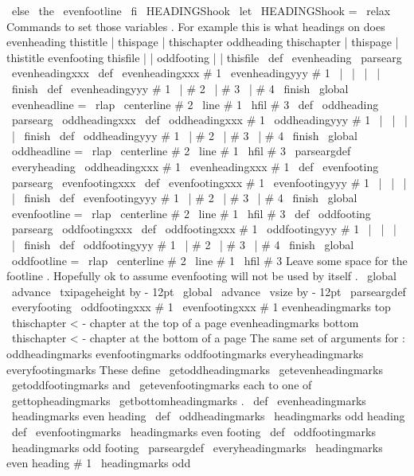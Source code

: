 {{{{{{\
else
\
the
\
evenfootline
\
fi
}
\
HEADINGShook
}
\
let
\
HEADINGShook
=
\
relax
%
Commands
to
set
those
variables
.
%
For
example
this
is
what
headings
on
does
%
evenheading
thistitle
|
thispage
|
thischapter
%
oddheading
thischapter
|
thispage
|
thistitle
%
evenfooting
thisfile
|
|
%
oddfooting
|
|
thisfile
\
def
\
evenheading
{
\
parsearg
\
evenheadingxxx
}
\
def
\
evenheadingxxx
#
1
{
\
evenheadingyyy
#
1
\
|
\
|
\
|
\
|
\
finish
}
\
def
\
evenheadingyyy
#
1
\
|
#
2
\
|
#
3
\
|
#
4
\
finish
{
%
\
global
\
evenheadline
=
{
\
rlap
{
\
centerline
{
#
2
}
}
\
line
{
#
1
\
hfil
#
3
}
}
}
\
def
\
oddheading
{
\
parsearg
\
oddheadingxxx
}
\
def
\
oddheadingxxx
#
1
{
\
oddheadingyyy
#
1
\
|
\
|
\
|
\
|
\
finish
}
\
def
\
oddheadingyyy
#
1
\
|
#
2
\
|
#
3
\
|
#
4
\
finish
{
%
\
global
\
oddheadline
=
{
\
rlap
{
\
centerline
{
#
2
}
}
\
line
{
#
1
\
hfil
#
3
}
}
}
\
parseargdef
\
everyheading
{
\
oddheadingxxx
{
#
1
}
\
evenheadingxxx
{
#
1
}
}
%
\
def
\
evenfooting
{
\
parsearg
\
evenfootingxxx
}
\
def
\
evenfootingxxx
#
1
{
\
evenfootingyyy
#
1
\
|
\
|
\
|
\
|
\
finish
}
\
def
\
evenfootingyyy
#
1
\
|
#
2
\
|
#
3
\
|
#
4
\
finish
{
%
\
global
\
evenfootline
=
{
\
rlap
{
\
centerline
{
#
2
}
}
\
line
{
#
1
\
hfil
#
3
}
}
}
\
def
\
oddfooting
{
\
parsearg
\
oddfootingxxx
}
\
def
\
oddfootingxxx
#
1
{
\
oddfootingyyy
#
1
\
|
\
|
\
|
\
|
\
finish
}
\
def
\
oddfootingyyy
#
1
\
|
#
2
\
|
#
3
\
|
#
4
\
finish
{
%
\
global
\
oddfootline
=
{
\
rlap
{
\
centerline
{
#
2
}
}
\
line
{
#
1
\
hfil
#
3
}
}
%
%
%
Leave
some
space
for
the
footline
.
Hopefully
ok
to
assume
%
evenfooting
will
not
be
used
by
itself
.
\
global
\
advance
\
txipageheight
by
-
12pt
\
global
\
advance
\
vsize
by
-
12pt
}
\
parseargdef
\
everyfooting
{
\
oddfootingxxx
{
#
1
}
\
evenfootingxxx
{
#
1
}
}
%
evenheadingmarks
top
\
thischapter
<
-
chapter
at
the
top
of
a
page
%
evenheadingmarks
bottom
\
thischapter
<
-
chapter
at
the
bottom
of
a
page
%
%
The
same
set
of
arguments
for
:
%
%
oddheadingmarks
%
evenfootingmarks
%
oddfootingmarks
%
everyheadingmarks
%
everyfootingmarks
%
These
define
\
getoddheadingmarks
\
getevenheadingmarks
%
\
getoddfootingmarks
and
\
getevenfootingmarks
each
to
one
of
%
\
gettopheadingmarks
\
getbottomheadingmarks
.
%
\
def
\
evenheadingmarks
{
\
headingmarks
{
even
}
{
heading
}
}
\
def
\
oddheadingmarks
{
\
headingmarks
{
odd
}
{
heading
}
}
\
def
\
evenfootingmarks
{
\
headingmarks
{
even
}
{
footing
}
}
\
def
\
oddfootingmarks
{
\
headingmarks
{
odd
}
{
footing
}
}
\
parseargdef
\
everyheadingmarks
{
\
headingmarks
{
even
}
{
heading
}
{
#
1
}
\
headingmarks
{
odd
}
}}}}}
